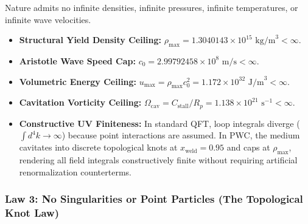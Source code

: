 \documentclass[11pt,a4paper]{article}
\begin{document}
Nature admits no infinite densities, infinite pressures, infinite temperatures, or infinite wave velocities.
\begin{itemize}
    \item \textbf{Structural Yield Density Ceiling:} $\rho_{\max} = 1.3040143 \times 10^{15}\text{ kg/m}^3 < \infty$.
    \item \textbf{Aristotle Wave Speed Cap:} $c_0 = 2.99792458 \times 10^8\text{ m/s} < \infty$.
    \item \textbf{Volumetric Energy Ceiling:} $u_{\max} = \rho_{\max} c_0^2 = 1.172 \times 10^{32}\text{ J/m}^3 < \infty$.
    \item \textbf{Cavitation Vorticity Ceiling:} $\Omega_{\text{cav}} = C_{\text{stall}} / R_p = 1.138 \times 10^{21}\text{ s}^{-1} < \infty$.
    \item \textbf{Constructive UV Finiteness:} In standard QFT, loop integrals diverge ($\int d^4k \to \infty$) because point interactions are assumed. In PWC, the medium cavitates into discrete topological knots at $x_{\text{weld}} = 0.95$ and caps at $\rho_{\max}$, rendering all field integrals constructively finite without requiring artificial renormalization counterterms.
\end{itemize}

\subsubsection{Law 3: No Singularities or Point Particles (The Topological Knot Law)}
\label{subsubsec:law_3_no_singularities}
\end{document}
